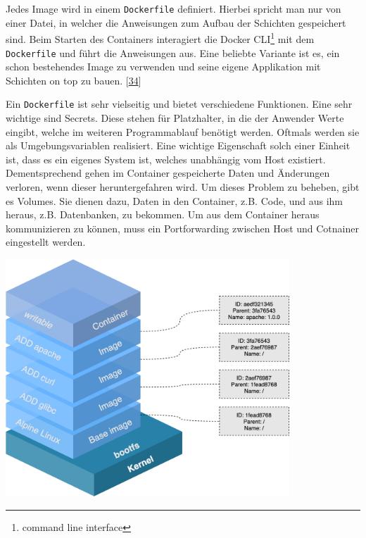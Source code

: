 \documentclass[
    headings=optiontotocandhead,%
    twoside,
    numbers=noenddot,%
    12pt, %
    titlepage, %
    parskip=full, %
    listof=leveldown, 
    numbers=noenddot, %
    a4paper,DIV=14,
    BCOR=15mm,
]{scrbook}
\newcommand{\passthrough}[1]{#1}
\let\origfigure=\figure
\let\endorigfigure=\endfigure
\renewenvironment{figure}[1][]{%
   \origfigure[H]
}{%
   \endorigfigure
}
\begin{document}
Jedes Image wird in einem \passthrough{\lstinline!Dockerfile!}
definiert. Hierbei spricht man nur von einer Datei, in welcher die
Anweisungen zum Aufbau der Schichten gespeichert sind. Beim Starten des
Containers interagiert die Docker CLI\footnote{command line interface}
mit dem \passthrough{\lstinline!Dockerfile!} und führt die Anweisungen
aus. Eine beliebte Variante ist es, ein schon bestehendes Image zu
verwenden und seine eigene Applikation mit Schichten on top zu bauen.
{[}\protect\hyperlink{ref-ibm-docker}{34}{]}

Ein \passthrough{\lstinline!Dockerfile!} ist sehr vielseitig und bietet
verschiedene Funktionen. Eine sehr wichtige sind Secrets. Diese stehen
für Platzhalter, in die der Anwender Werte eingibt, welche im weiteren
Programmablauf benötigt werden. Oftmals werden sie als
Umgebungsvariablen realisiert. Eine wichtige Eigenschaft solch einer
Einheit ist, dass es ein eigenes System ist, welches unabhängig vom Host
existiert. Dementsprechend gehen im Container gespeicherte Daten und
Änderungen verloren, wenn dieser heruntergefahren wird. Um dieses
Problem zu beheben, gibt es Volumes. Sie dienen dazu, Daten in den
Container, z.B. Code, und aus ihm heraus, z.B. Datenbanken, zu bekommen.
Um aus dem Container heraus kommunizieren zu können, muss ein
Portforwarding zwischen Host und Cotnainer eingestellt werden.

\begin{figure}
\centering
\includegraphics[width=0.8\textwidth,height=\textheight]{img/Schrempf/container-layers-overview.png}
\caption{Containerschichten
{[}\protect\hyperlink{ref-docker-image-layers}{36}{]}}
\end{figure}
\end{document}
